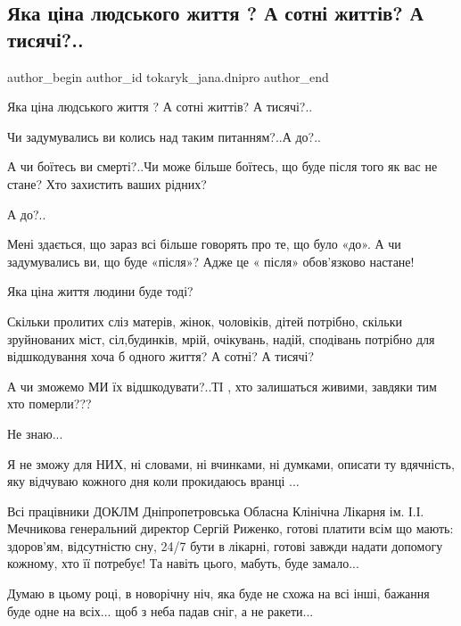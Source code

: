  
 
 
 
 

\subsection{Яка ціна людського життя ? А сотні життів? А тисячі?..}
\label{sec:15_12_2022.fb.tokaryk_jana.dnipro.1.yaka_ts_na_lyudskogo}

\ifcmt
 author_begin
   author_id tokaryk_jana.dnipro
 author_end
\fi

Яка ціна людського життя ? А сотні життів? А тисячі?..

Чи задумувались  ви колись над таким питанням?..А до?..

А чи боїтесь ви  смерті?..Чи може більше боїтесь, що буде після того як вас не
стане? Хто захистить ваших рідних?

А до?..

Мені здається, що зараз всі більше говорять про те, що було «до». А чи
задумувались ви, що буде «після»? Адже це « після» обов’язково настане!

Яка ціна життя людини буде тоді? 

Скільки пролитих сліз матерів, жінок, чоловіків, дітей потрібно, скільки
зруйнованих міст, сіл,будинків,  мрій, очікувань, надій, сподівань потрібно для
відшкодування хоча б одного життя? А сотні? А тисячі? 

А чи зможемо МИ їх відшкодувати?..ТІ , хто залишаться живими, завдяки тим хто
померли???

Не знаю...

Я не зможу для НИХ, ні словами, ні вчинками, ні думками, описати ту вдячність,
яку відчуваю кожного дня коли прокидаюсь вранці ...

Всі  працівники ДОКЛМ Дніпропетровська Обласна Клінічна Лікарня ім. І.І.
Мечникова  генеральний директор Сергій Риженко, готові платити всім що мають:
здоров’ям, відсутністю сну, 24/7 бути в  лікарні, готові завжди надати допомогу
кожному, хто її потребує! Та навіть цього, мабуть, буде замало...

Думаю в цьому році, в новорічну ніч, яка буде не схожа на всі інші, бажання
буде одне на всіх... щоб з неба падав сніг, а не ракети...
